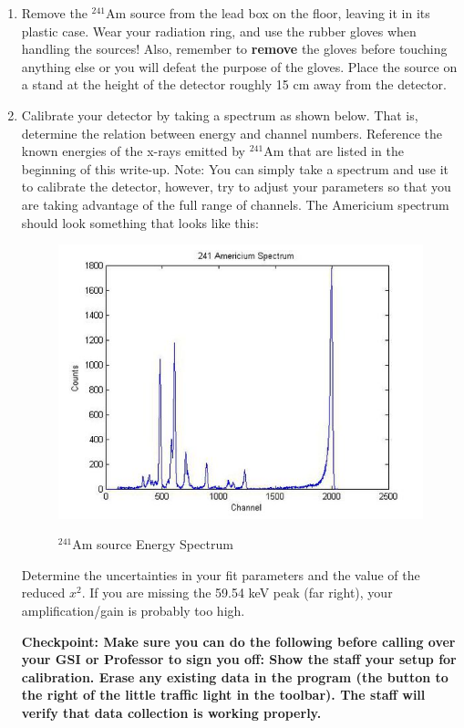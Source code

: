 \documentclass{../lab}
\begin{document}
\begin{enumerate}
    \item Remove the $^{241}$Am source from the lead box on the floor, leaving it in its plastic case. Wear your radiation ring, and use the rubber gloves when handling the sources! Also, remember to \textbf{remove} the gloves before touching anything else or you will defeat the purpose of the gloves. Place the source on a stand at the height of the detector roughly 15 cm away from the detector.

    \item Calibrate your detector by taking a spectrum as shown below. That is, determine the relation between energy and channel numbers. Reference the known energies of the x-rays emitted by $^{241}$Am that are listed in the beginning of this write-up. Note: You can simply take a spectrum and use it to calibrate the detector, however, try to adjust your parameters so that you are taking advantage of the full range of channels. The Americium spectrum should look something that looks like this:
    \begin{figure}[h]
        \centering
        \href{http://experimentationlab.berkeley.edu/sites/default/files/images/550px-COMimage02.jpg}{\includegraphics[width=0.8\linewidth]{images/550px-COMimage02.jpg}}
        \caption{$^{241}$Am source Energy Spectrum}
        \label{fig:550px-COMimage02}
    \end{figure}
 
	Determine the uncertainties in your fit parameters and the value of the reduced $x^2$. If you are missing the 59.54 keV peak (far right), your amplification/gain is probably too high. 
	
	\textbf{Checkpoint: Make sure you can do the following before calling over your GSI or Professor to sign you off:
	Show the staff your setup for calibration. Erase any existing data in the program (the button to the right of the little traffic light in the toolbar). The staff will verify that data collection is working properly.}


\end{enumerate}
\end{document}
